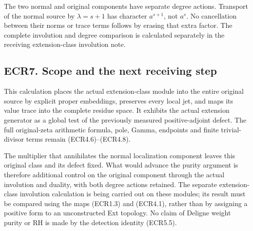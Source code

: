 The two normal and original components have separate degree actions.
Transport of the normal source by \(\lambda=s+1\) has character
\(a^{s+1}\), not \(a^s\). No cancellation between their norms or trace
terms follows by erasing that extra factor. The complete involution and
degree comparison is calculated separately in the receiving
extension-class involution note.

\subsection{ECR7. Scope and the next receiving
step}\label{ecr7.-scope-and-the-next-receiving-step}

This calculation places the actual extension-class module into the
entire original source by explicit proper embeddings, preserves every
local jet, and maps its value trace into the complete residue space. It
exhibits the actual extension generator as a global test of the
previously measured positive-adjoint defect. The full original-zeta
arithmetic formula, pole, Gamma, endpoints and finite trivial-divisor
terms remain (ECR4.6)--(ECR4.8).

The multiplier that annihilates the normal localization component leaves
this original class and its defect fixed. What would advance the purity
argument is therefore additional control on the original component
through the actual involution and duality, with both degree actions
retained. The separate extension-class involution calculation is being
carried out on these modules; its result must be compared using the maps
(ECR1.3) and (ECR4.1), rather than by assigning a positive form to an
unconstructed Ext topology. No claim of Deligne weight purity or RH is
made by the detection identity (ECR5.5).
